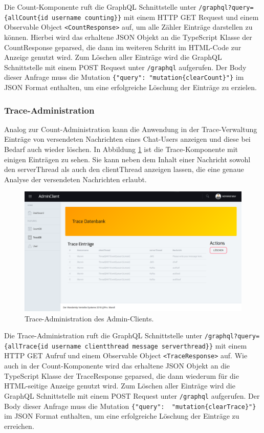 \documentclass[10pt,journal,compsoc]{IEEEtran}
\begin{document}
Die Count-Komponente ruft die GraphQL Schnittstelle unter \lstinline|/graphql?query={allCount{id username counting}}| mit einem HTTP GET Request und einem Observable Object \lstinline|<CountResponse>| auf, um alle Zähler Einträge darstellen zu können. Hierbei wird das erhaltene JSON Objekt an die TypeScript Klasse der CountResponse geparsed, die dann im weiteren Schritt im HTML-Code zur Anzeige genutzt wird.
Zum Löschen aller Einträge wird die GraphQL Schnittstelle mit einem POST Request unter \lstinline|/graphql| aufgerufen. Der Body dieser Anfrage muss die Mutation \lstinline|{"query": "mutation{clearCount}"}| im JSON Format enthalten, um eine erfolgreiche Löschung der Einträge zu erzielen.


\subsubsection{Trace-Administration}
Analog zur Count-Administration kann die Anwendung in der Trace-Verwaltung Einträge von versendeten Nachrichten eines Chat-Users anzeigen und diese bei Bedarf auch wieder löschen. In Abbildung \ref{fig:adminClientTrace} ist die Trace-Komponente mit einigen Einträgen zu sehen. Sie kann neben dem Inhalt einer Nachricht sowohl den serverThread als auch den clientThread anzeigen lassen, die eine genaue Analyse der versendeten Nachrichten erlaubt.

\begin{figure}[h]
	\centering
	\includegraphics[scale=0.25]{Bilder/AdminClient_Trace.PNG}
	\caption{Trace-Administration des Admin-Clients.}
	\label{fig:adminClientTrace}
\end{figure}

Die Trace-Administration ruft die GraphQL Schnittstelle unter \lstinline|/graphql?query={allTrace{id username clientthread message serverthread}}| mit einem HTTP GET Aufruf und einem Observable Object \lstinline|<TraceResponse>| auf. Wie auch in der Count-Komponente wird das erhaltene JSON Objekt an die TypeScript Klasse der TraceResponse geparsed, die dann wiederum für die HTML-seitige Anzeige genutzt wird.
Zum Löschen aller Einträge wird die GraphQL Schnittstelle mit einem POST Request unter \lstinline|/graphql| aufgerufen. Der Body dieser Anfrage muss die Mutation \lstinline|{"query":  "mutation{clearTrace}"}| im JSON Format enthalten, um eine erfolgreiche Löschung der Einträge zu erreichen.
\end{document}
